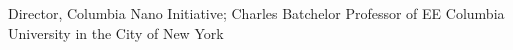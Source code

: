 %
{Director, Columbia Nano Initiative; Charles Batchelor Professor of EE}%
{Columbia University in the City of New York}%
{\quad{}}